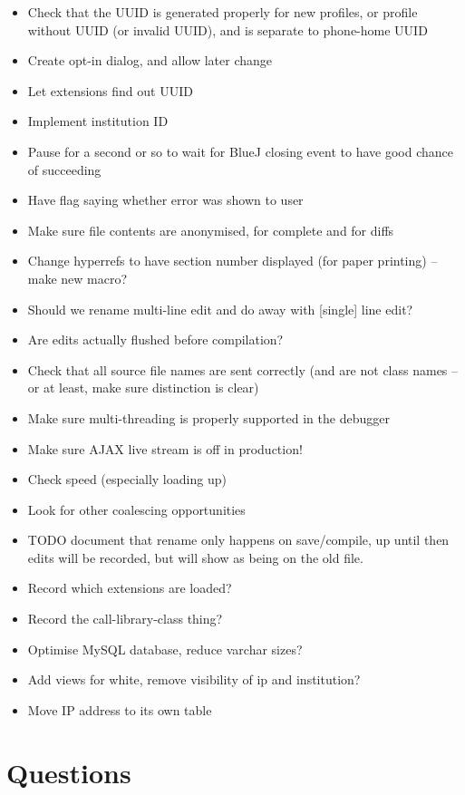 \documentclass{book}
\begin{document}
\begin{itemize}
\item Check that the UUID is generated properly for new profiles, or profile without
UUID (or invalid UUID), and is separate to phone-home UUID
\item Create opt-in dialog, and allow later change
\item Let extensions find out UUID
\item Implement institution ID
\item Pause for a second or so to wait for BlueJ closing event to have good
  chance of succeeding
\item Have flag saying whether error was shown to user
\item Make sure file contents are anonymised, for complete and for diffs
\item Change hyperrefs to have section number displayed (for paper printing)
  -- make new macro?
\item Should we rename multi-line edit and do away with [single] line edit?
\item Are edits actually flushed before compilation?
\item Check that all source file names are sent correctly (and are not class
  names -- or at least, make sure distinction is clear)
\item Make sure multi-threading is properly supported in the debugger
\item Make sure AJAX live stream is off in production!
\item Check speed (especially loading up)
\item Look for other coalescing opportunities
\item TODO document that rename only happens on save/compile, up until then
  edits will be recorded, but will show as being on the old file.
\item Record which extensions are loaded?
\item Record the call-library-class thing?
\item Optimise MySQL database, reduce varchar sizes?
\item Add views for white, remove visibility of ip and institution?
\item Move IP address to its own table
\end{itemize}

\section{Questions}
\end{document}
